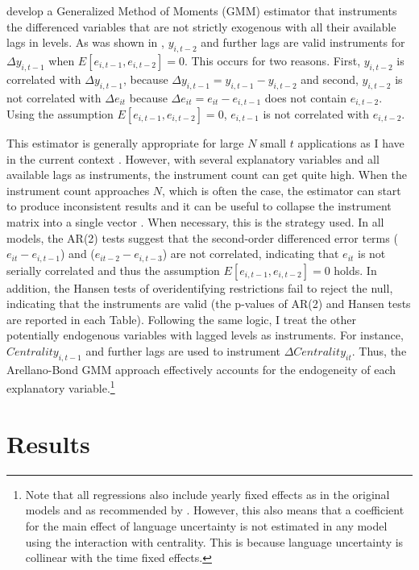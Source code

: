 \citet{arellano1991} develop a Generalized Method of Moments (GMM) estimator that instruments the differenced variables that are not strictly exogenous with all their available lags in levels. As was shown in \citet{arellano2001}, $y_{i,t-2}$ and further lags are valid instruments for $\Delta y_{i,t-1}$ when $E[e_{i,t-1}, e_{i,t-2}] = 0$. This occurs for two reasons. First, $y_{i,t-2}$ is correlated with $\Delta y_{i,t-1}$, because $\Delta y_{i,t-1} = y_{i,t-1}-y_{i,t-2}$ and second, $y_{i,t-2}$ is not correlated with $\Delta e_{it}$ because $\Delta e_{it} = e_{it}-e_{i,t-1}$ does not contain $e_{i,t-2}$. Using the assumption $E[e_{i,t-1}, e_{i,t-2}] = 0$, $e_{i,t-1}$ is not correlated with $e_{i,t-2}$. 

This estimator is generally appropriate for large $N$ small $t$ applications as I have in the current context \citep{arellano1995}. However, with several explanatory variables and all available lags as instruments, the instrument count can get quite high. When the instrument count approaches $N$, which is often the case, the estimator can start to produce inconsistent results and it can be useful to collapse the instrument matrix into a single vector \citep{roodman2006}. When necessary, this is the strategy used. In all models, the AR(2) tests \citep{arellano1991} suggest that the second-order differenced error terms ($e_{it}-e_{i,t-1}$) and ($e_{it-2}-e_{i,t-3}$) are not correlated, indicating that $e_{it}$ is not serially correlated and thus the assumption $E[e_{i,t-1}, e_{i,t-2}] = 0$ holds. In addition, the Hansen tests of overidentifying restrictions fail to reject the null, indicating that the instruments are valid (the p-values of AR(2) and Hansen tests are reported in each Table). Following the same logic, I treat the other potentially endogenous variables with lagged levels as instruments. For instance, $Centrality_{i,t-1}$ and further lags are used to instrument $\Delta Centrality_{it}$. Thus, the Arellano-Bond GMM approach effectively accounts for the endogeneity of each explanatory variable.\footnote{Note that all regressions also include yearly fixed effects as in the original models and as recommended by \citet{roodman2006}. However, this also means that a coefficient for the main effect of language uncertainty is not estimated in any model using the interaction with centrality. This is because language uncertainty is collinear with the time fixed effects.}

\section{Results}

